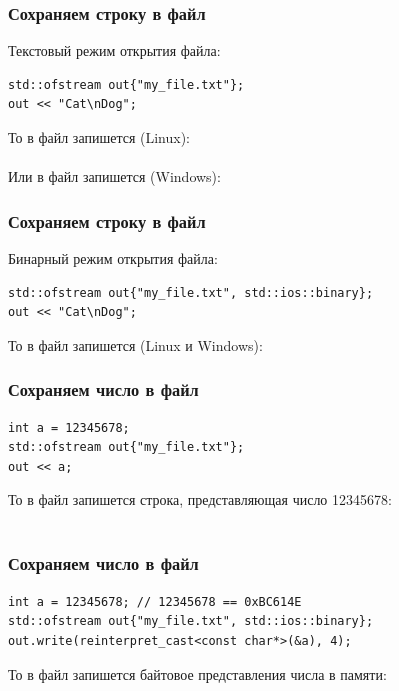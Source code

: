 \documentclass[10pt,pdf,hyperref={unicode}]{beamer}
\begin{document}
\begin{frame}[fragile]
\frametitle{Сохраняем строку в файл}
Текстовый режим открытия файла:
\begin{lstlisting}
std::ofstream out{"my_file.txt"};
out << "Cat\nDog";
\end{lstlisting}
То в файл запишется (Linux):\\
\noindent{}\\
Или в файл запишется (Windows):\\
\noindent{}
\end{frame}


\begin{frame}[fragile]
\frametitle{Сохраняем строку в файл}
Бинарный режим открытия файла:
\begin{lstlisting}
std::ofstream out{"my_file.txt", std::ios::binary};
out << "Cat\nDog";
\end{lstlisting}

То в файл запишется (Linux и Windows):\\
\noindent{}
\end{frame}

\begin{frame}[fragile]
\frametitle{Сохраняем число в файл}
\begin{lstlisting}
int a = 12345678;
std::ofstream out{"my_file.txt"};
out << a;
\end{lstlisting}
То в файл запишется строка, представляющая число 12345678:\\
\noindent{}\\
\end{frame}

\begin{frame}[fragile]
\frametitle{Сохраняем число в файл}
\begin{lstlisting}
int a = 12345678; // 12345678 == 0xBC614E
std::ofstream out{"my_file.txt", std::ios::binary};
out.write(reinterpret_cast<const char*>(&a), 4);
\end{lstlisting}
То в файл запишется байтовое представления числа в памяти:\\
\noindent{}\\
\end{frame}
\end{document}
